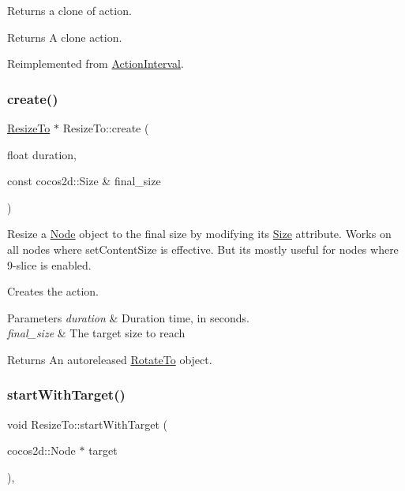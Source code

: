 Returns a clone of action.

\begin{DoxyReturn}{Returns}
A clone action. 
\end{DoxyReturn}


Reimplemented from \hyperlink{classActionInterval_abc93ce0c2f54a90eb216a7803f25f44a}{Action\+Interval}.

\mbox{\label{classResizeTo_a3e41f0c44b3f0349ca041947f4f0b12e}} 
\subsubsection{\texorpdfstring{create()}{create()}}
{\footnotesize\ttfamily \hyperlink{classResizeTo}{Resize\+To} $\ast$ Resize\+To\+::create (\begin{DoxyParamCaption}\item[{float}]{duration,  }\item[{const cocos2d\+::\+Size \&}]{final\+\_\+size }\end{DoxyParamCaption})\hspace{0.3cm}{\ttfamily [static]}}



Resize a \hyperlink{classNode}{Node} object to the final size by modifying it\textquotesingle{}s \hyperlink{classSize}{Size} attribute. Works on all nodes where set\+Content\+Size is effective. But it\textquotesingle{}s mostly useful for nodes where 9-\/slice is enabled. 

Creates the action. 
\begin{DoxyParams}{Parameters}
{\em duration} & Duration time, in seconds. \\
\hline
{\em final\+\_\+size} & The target size to reach \\
\hline
\end{DoxyParams}
\begin{DoxyReturn}{Returns}
An autoreleased \hyperlink{classRotateTo}{Rotate\+To} object. 
\end{DoxyReturn}
\mbox{\label{classResizeTo_a7fb76b25f5dbf258bdafaa615f13a05b}} 
\subsubsection{\texorpdfstring{start\+With\+Target()}{startWithTarget()}}
{\footnotesize\ttfamily void Resize\+To\+::start\+With\+Target (\begin{DoxyParamCaption}\item[{cocos2d\+::\+Node $\ast$}]{target }\end{DoxyParamCaption})\hspace{0.3cm}{\ttfamily [override]}, {\ttfamily [virtual]}}

